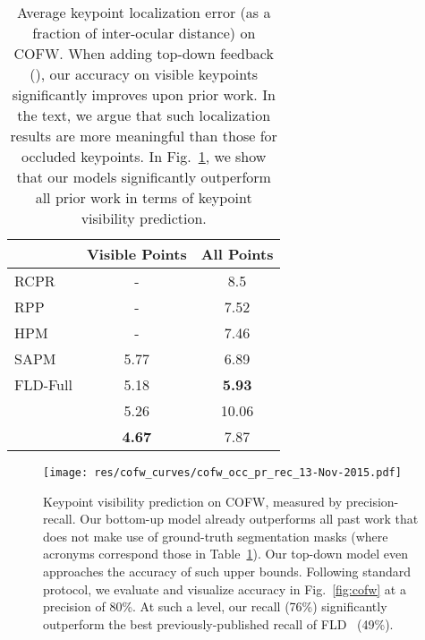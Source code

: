 \documentclass[10pt,twocolumn,letterpaper]{article}
\newcommand{\QP}[1]{{}}
\begin{document}
\begin{table}
  \begin{center}
    \begin{tabular}{l|c|c}
                                    & Visible Points & All Points \\
      \hline \hline
      RCPR\cite{burgos2013robust}   & -              & 8.5        \\
      RPP\cite{yang2015robust}      & -              & 7.52       \\
      HPM\cite{ghiasi2014occlusion} & -              & 7.46       \\
      SAPM\cite{ghiasi2015sapm}     & 5.77           & 6.89       \\
      FLD-Full\cite{wu2015fld}      & 5.18           & {\bf 5.93} \\
      \hline
\QP{1}                        & 5.26           & 10.06      \\
      \QP{2}                        & {\bf 4.67}     & 7.87       \\
    \end{tabular}
  \end{center}
\caption{Average keypoint localization error (as a fraction of
    inter-ocular distance) on COFW. When adding top-down feedback
    (\QP{2}), our accuracy on visible keypoints significantly improves
    upon prior work. In the text, we argue that such localization
    results are more meaningful than those for occluded keypoints. In
    Fig.~\ref{fig:cofw-curves}, we show that our models significantly
    outperform all prior work in terms of keypoint visibility
    prediction. }
\label{table:cofw}
\end{table}


\begin{figure}[t]
  \centering
\texttt{[image: res/cofw\_curves/cofw\_occ\_pr\_rec\_13-Nov-2015.pdf]}
\caption{Keypoint visibility prediction on COFW, measured by
    precision-recall. Our bottom-up model \QP{1} already
    outperforms all past work that does not make use of ground-truth
    segmentation masks (where acronyms correspond those in
    Table~\ref{table:cofw}). Our top-down model \QP{2} even
    approaches the accuracy of such upper bounds. Following standard protocol,
    we evaluate and visualize accuracy in Fig.~\ref{fig:cofw} at a
    precision of 80\%. At such a level, our recall (76\%) significantly outperform the best
    previously-published recall of FLD~\cite{wu2015fld} (49\%).}
  \label{fig:cofw-curves}
\end{figure}
\end{document}
